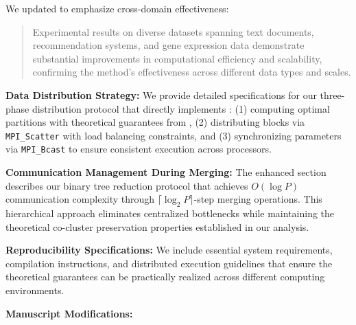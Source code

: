 \documentclass{ar2rc}
\theoremstyle{definition}
\theoremstyle{remark} %
\begin{document}
We updated  to emphasize cross-domain effectiveness:

\begin{quote}
  Experimental results on diverse datasets spanning text documents, recommendation systems, and gene expression data demonstrate substantial improvements in computational efficiency and scalability, confirming the method's effectiveness across different data types and scales.
\end{quote}



\textbf{Data Distribution Strategy:}
We provide detailed specifications for our three-phase distribution protocol that directly implements : (1) computing optimal partitions with theoretical guarantees from , (2) distributing blocks via \texttt{MPI\_Scatter} with load balancing constraints, and (3) synchronizing parameters via \texttt{MPI\_Bcast} to ensure consistent execution across processors.

\textbf{Communication Management During Merging:}
The enhanced section describes our binary tree reduction protocol that achieves $O(\log P)$ communication complexity through $\lceil \log_2 P \rceil$-step merging operations. This hierarchical approach eliminates centralized bottlenecks while maintaining the theoretical co-cluster preservation properties established in our analysis.

\textbf{Reproducibility Specifications:}
We include essential system requirements, compilation instructions, and distributed execution guidelines that ensure the theoretical guarantees can be practically realized across different computing environments.

\textbf{Manuscript Modifications:}
\end{document}
